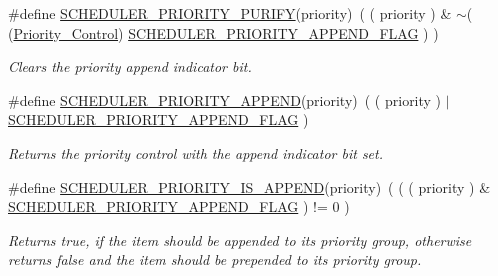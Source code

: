\begin{DoxyCompactItemize}
\#define \mbox{\hyperlink{group__RTEMSScoreScheduler_ga8e11bd14b7c5a2f713b9864aea7bd786}{S\+C\+H\+E\+D\+U\+L\+E\+R\+\_\+\+P\+R\+I\+O\+R\+I\+T\+Y\+\_\+\+P\+U\+R\+I\+FY}}(priority)~( ( priority ) \& $\sim$( (\mbox{\hyperlink{group__RTEMSScorePriority_ga59d02b58072d31a9a1cfe644557aefe2}{Priority\+\_\+\+Control}}) \mbox{\hyperlink{group__RTEMSScoreScheduler_ga4f92274867a1bb479fd308b47235c202}{S\+C\+H\+E\+D\+U\+L\+E\+R\+\_\+\+P\+R\+I\+O\+R\+I\+T\+Y\+\_\+\+A\+P\+P\+E\+N\+D\+\_\+\+F\+L\+AG}} ) )
\begin{DoxyCompactList}\small\item\em Clears the priority append indicator bit. \end{DoxyCompactList}\item 
\mbox{\label{group__RTEMSScoreScheduler_ga2bc5f17fd4204768543893a50c09bd26}} 
\#define \mbox{\hyperlink{group__RTEMSScoreScheduler_ga2bc5f17fd4204768543893a50c09bd26}{S\+C\+H\+E\+D\+U\+L\+E\+R\+\_\+\+P\+R\+I\+O\+R\+I\+T\+Y\+\_\+\+A\+P\+P\+E\+ND}}(priority)~( ( priority ) $\vert$ \mbox{\hyperlink{group__RTEMSScoreScheduler_ga4f92274867a1bb479fd308b47235c202}{S\+C\+H\+E\+D\+U\+L\+E\+R\+\_\+\+P\+R\+I\+O\+R\+I\+T\+Y\+\_\+\+A\+P\+P\+E\+N\+D\+\_\+\+F\+L\+AG}} )
\begin{DoxyCompactList}\small\item\em Returns the priority control with the append indicator bit set. \end{DoxyCompactList}\item 
\mbox{\label{group__RTEMSScoreScheduler_gab2dd406724cf98352ff1a7218feb06c0}} 
\#define \mbox{\hyperlink{group__RTEMSScoreScheduler_gab2dd406724cf98352ff1a7218feb06c0}{S\+C\+H\+E\+D\+U\+L\+E\+R\+\_\+\+P\+R\+I\+O\+R\+I\+T\+Y\+\_\+\+I\+S\+\_\+\+A\+P\+P\+E\+ND}}(priority)~( ( ( priority ) \& \mbox{\hyperlink{group__RTEMSScoreScheduler_ga4f92274867a1bb479fd308b47235c202}{S\+C\+H\+E\+D\+U\+L\+E\+R\+\_\+\+P\+R\+I\+O\+R\+I\+T\+Y\+\_\+\+A\+P\+P\+E\+N\+D\+\_\+\+F\+L\+AG}} ) != 0 )
\begin{DoxyCompactList}\small\item\em Returns true, if the item should be appended to its priority group, otherwise returns false and the item should be prepended to its priority group. \end{DoxyCompactList}\end{DoxyCompactItemize}

